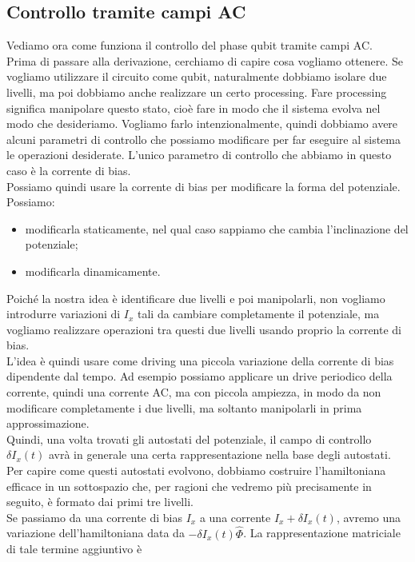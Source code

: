 \subsection{Controllo tramite campi AC}
Vediamo ora come funziona il controllo del phase qubit tramite campi AC.\\
Prima di passare alla derivazione, cerchiamo di capire cosa vogliamo ottenere. Se vogliamo utilizzare il circuito come qubit, naturalmente dobbiamo isolare due livelli, ma poi dobbiamo anche realizzare un certo processing. Fare processing significa manipolare questo stato, cioè fare in modo che il sistema evolva nel modo che desideriamo. Vogliamo farlo intenzionalmente, quindi dobbiamo avere alcuni parametri di controllo che possiamo modificare per far eseguire al sistema le operazioni desiderate. L'unico parametro di controllo che abbiamo in questo caso è la corrente di bias.\\
Possiamo quindi usare la corrente di bias per modificare la forma del potenziale. Possiamo:
\begin{itemize}[leftmargin=0.5cm]
    \item modificarla staticamente, nel qual caso sappiamo che cambia l'inclinazione del potenziale;
    \item modificarla dinamicamente.
\end{itemize}
Poiché la nostra idea è identificare due livelli e poi manipolarli, non vogliamo introdurre variazioni di $I_x$ tali da cambiare completamente il potenziale, ma vogliamo realizzare operazioni tra questi due livelli usando proprio la corrente di bias.\\
L'idea è quindi usare come driving una piccola variazione della corrente di bias dipendente dal tempo. Ad esempio possiamo applicare un drive periodico della corrente, quindi una corrente AC, ma con piccola ampiezza, in modo da non modificare completamente i due livelli, ma soltanto manipolarli in prima approssimazione.\\
Quindi, una volta trovati gli autostati del potenziale, il campo di controllo $\delta I_x(t)$ avrà in generale una certa rappresentazione nella base degli autostati. Per capire come questi autostati evolvono, dobbiamo costruire l'hamiltoniana efficace in un sottospazio che, per ragioni che vedremo più precisamente in seguito, è formato dai primi tre livelli.\\
Se passiamo da una corrente di bias $I_x$ a una corrente $I_x + \delta I_x(t)$, avremo una variazione dell'hamiltoniana data da $-\delta I_x(t)\hat{\Phi}$. La rappresentazione matriciale di tale termine aggiuntivo è
